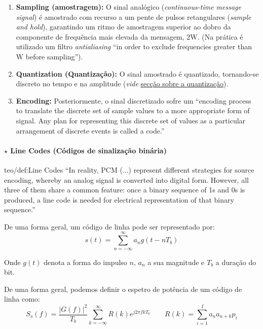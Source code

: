 \begin{enumerate}
    \item \textbf{Sampling (amostragem):} O sinal analógico (\textit{continuous-time message signal}) é amostrado com recurso a um pente de pulsos retangulares (\textit{sample and hold}), garantindo um ritmo de amostragem superior ao dobro da componente de frequência mais elevada da mensagem, 2W. (Na prática é utilizado um filtro \textit{antialiasing} ``in order to exclude frequencies greater than W before sampling''\cite{Haykin2007}).
    
    \item \textbf{Quantization (Quantização):} O sinal amostrado é quantizado, tornando-se discreto no tempo e na amplitude (\textit{vide} \hyperref[subsubsec:quantization]{secção sobre a quantização}).
    
    \item \textbf{Encoding:} Posteriormente, o sinal discretizado sofre um ``encoding process to translate the discrete set of sample values to a more appropriate form of signal. Any plan for representing this discrete set of values as a particular arrangement of discrete events is called a code.''\cite{Haykin2007}
\end{enumerate}

\paragraph[3.3.2.1 Line Codes]{$\pmb{\star}$ Line Codes (Códigos de sinalização binária)}
\begin{theo}{teo/def:Line Codes}\label{teo/def:LineCodes}
 ``In reality, PCM (...) represent different strategies for source encoding, whereby
an analog signal is converted into digital form. However, all three of them share a common
feature: once a binary sequence of 1s and 0s is produced, a line code is needed for electrical representation of that binary sequence.''
\end{theo}

\noindent De uma forma geral, um código de linha pode ser representado por:
$$
    s(t) = \sum_{n=-\infty}^{\infty} a_n g(t - nT_b)
$$

\noindent Onde $g(t)$ denota a forma do impulso $n$, $a_n$ a sua magnitude e $T_b$ a duração do bit. 

\noindent De uma forma geral, podemos definir o espetro de potência de um código de linha como:
$$
    \boxed{S_s(f) = \frac{|G(f)|^2}{T_b}\sum_{k = -\infty}^{\infty}R(k)e^{j2\pi f k T_b}}\qquad
    \boxed{R(k) = \sum_{i = 1}^{I} a_{n}a_{n+k}p_i}
$$

